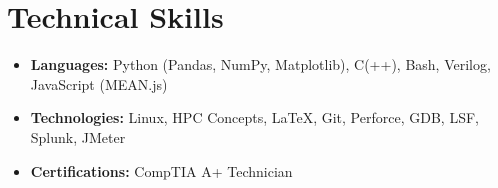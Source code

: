 \documentclass[11pt,letterpaper,sans]{moderncv}
\begin{document}
\begin{itemize}

\end{itemize}




\section{Technical Skills}

\vspace{2pt}

\begin{itemize}
\item[]  \textbf{Languages:} Python (Pandas, NumPy, Matplotlib), C(++), Bash, Verilog, JavaScript (MEAN.js)
\vspace{3pt}
\item[]  \textbf{Technologies:} Linux, HPC Concepts, LaTeX, Git, Perforce, GDB, LSF, Splunk, JMeter
\vspace{3pt}



\item[]  \textbf{Certifications:} CompTIA A+ Technician

\end{itemize}
\end{document}

